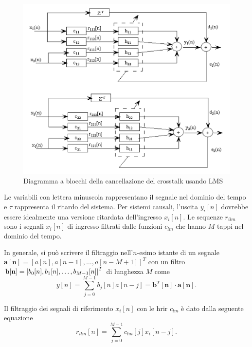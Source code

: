 \documentclass[12pt,a4paper,titlepage]{article}
\begin{document}
\begin{figure}[h]
	\centering	
	\includegraphics[width=\textwidth]{Immagini/lms.png}
	\caption{Diagramma a blocchi della cancellazione del crosstalk usando LMS}
	\label{fig:lms}
\end{figure}

Le variabili con lettera minuscola rappresentano il segnale nel dominio del tempo e $\tau$ rappresenta il ritardo del sistema. Per sistemi causali, l'uscita $y_i[n]$ dovrebbe essere idealmente una versione ritardata dell'ingresso $x_i[n]$. Le sequenze $r_{ilm}$ sono i segnali $x_i[n]$ di ingresso filtrati dalle funzioni $c_{lm}$ che hanno $M$ tappi nel dominio del tempo.

In generale, si può scrivere il filtraggio nell'$n$-esimo istante di un segnale $\mathbf{a[n]} = \left[a[n], a[n-1], \dots, a[n - M + 1]\right]^T$ con un filtro $\mathbf{b[n]} =  \left[b_{0}[n], b_{1}[n], \dots,\\ b_{M-1}[n]\right]^T$ di lunghezza $M$ come
\begin{equation}\label{eq:filtraggio_prodotto_scalare}
y[n] = \sum_{j=0}^{M-1}b_{j}[n]a[n-j] = \mathbf{b}^T[\mathbf{n}] \cdot \mathbf{a}[\mathbf{n}].
\end{equation}

Il filtraggio dei segnali di riferimento $x_i[n]$ con le hrir $c_{lm}$ è dato dalla seguente equazione
\begin{equation}\label{eq:r_ilm}
r_{ilm}[n]=\sum_{j=0}^{M-1}c_{lm}[j]x_i[n-j].
\end{equation}
\end{document}
